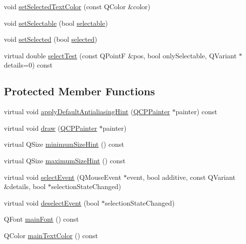 \begin{DoxyCompactItemize}
\item 
void \hyperlink{class_q_c_p_plot_title_a09ffd8c52ac8824d00382f84be391b66}{set\-Selected\-Text\-Color} (const Q\-Color \&color)
\item 
void \hyperlink{class_q_c_p_plot_title_a8866b07b9fa14877d4cefbf38406c5dd}{set\-Selectable} (bool \hyperlink{class_q_c_p_plot_title_a8d75c7cbcf2049c9512a3335d6f11416}{selectable})
\item 
void \hyperlink{class_q_c_p_plot_title_a8d441a889d371307df86f1ab7687a333}{set\-Selected} (bool \hyperlink{class_q_c_p_plot_title_a9771f3a4bca026484d7c8b5d953b5e82}{selected})
\item 
virtual double \hyperlink{class_q_c_p_plot_title_a5b7ae716be9134a48f4e378feb0e6699}{select\-Test} (const Q\-Point\-F \&pos, bool only\-Selectable, Q\-Variant $\ast$details=0) const 
\end{DoxyCompactItemize}
\subsection*{Protected Member Functions}
\begin{DoxyCompactItemize}
\item 
virtual void \hyperlink{class_q_c_p_plot_title_a0e2a491864bf8d8e8b159ef38e9d85bd}{apply\-Default\-Antialiasing\-Hint} (\hyperlink{class_q_c_p_painter}{Q\-C\-P\-Painter} $\ast$painter) const 
\item 
virtual void \hyperlink{class_q_c_p_plot_title_ae4f1f8d24489628dabb7256363b097d2}{draw} (\hyperlink{class_q_c_p_painter}{Q\-C\-P\-Painter} $\ast$painter)
\item 
virtual Q\-Size \hyperlink{class_q_c_p_plot_title_a695e6037e72a1e129387e7e4a980faea}{minimum\-Size\-Hint} () const 
\item 
virtual Q\-Size \hyperlink{class_q_c_p_plot_title_a2afaf11a379038e5ca58040a0eb0ae4c}{maximum\-Size\-Hint} () const 
\item 
virtual void \hyperlink{class_q_c_p_plot_title_a22672ef2abe442b1e73b7ee04cff9bdd}{select\-Event} (Q\-Mouse\-Event $\ast$event, bool additive, const Q\-Variant \&details, bool $\ast$selection\-State\-Changed)
\item 
virtual void \hyperlink{class_q_c_p_plot_title_ac6dfce05bebdb9bd0bfacd5ff02f3325}{deselect\-Event} (bool $\ast$selection\-State\-Changed)
\item 
Q\-Font \hyperlink{class_q_c_p_plot_title_a7e74004e3a68118b16491848708a8b3a}{main\-Font} () const 
\item 
Q\-Color \hyperlink{class_q_c_p_plot_title_ac1b02546563a2e76f97d78a576f82f5a}{main\-Text\-Color} () const 
\end{DoxyCompactItemize}
